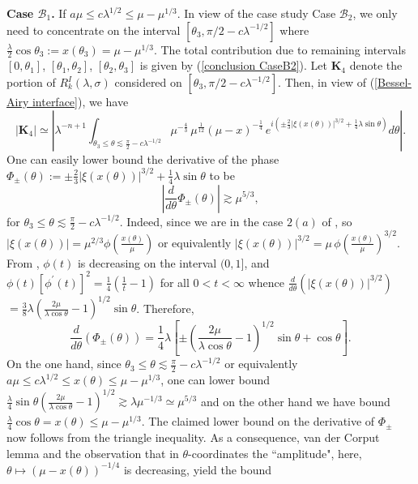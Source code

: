 \documentclass[11pt, reqno]{amsart}
\theoremstyle{plain}
\theoremstyle{remark}
\theoremstyle{example}
\theoremstyle{definition}
\numberwithin{equation}{section}
\begin{document}
\noindent \textbf{Case $\mathcal{B}_1$.} If $a \mu  \leq c \lambda^{1/2} \leq \mu - \mu^{1/3}$. In view of the case study Case $\mathcal{B}_{2}$, we only need to concentrate on the interval $[\theta_{3}, \pi / 2 - c \lambda^{-1/2}]$ where $\frac{\lambda}{2} \cos{\theta_{3}}:= x(\theta_{3})=\mu - \mu^{1/3}$. The total contribution due to remaining intervals $[0,\theta_{1}]$, $[\theta_{1},\theta_{2}]$, $[\theta_{2},\theta_{3}]$ is given by (\ref{conclusion CaseB2}). Let $ \textbf{K}_{4}$ denote the portion of $R_{k}^{I}(\lambda, \sigma)$ considered on $[\theta_{3}, \pi / 2 - c \lambda^{-1/2}]$. Then, in view of (\ref{Bessel-Airy interface}), we have
\begin{equation}\label{1 last piece Airy-Bessel}
  |\textbf{K}_{4}| \simeq \left| \lambda^{-n+1}  \int_{\theta_{3} \leq \theta \lesssim \frac{\pi}{2} - c \lambda^{-1/2}} \mu^{{-\textstyle\frac{4}{3}} } \,   \mu^{ {\textstyle\frac{1}{12} } }  ( \mu - x  )^{ - {\textstyle\frac{1}{4}  } }   \, e^{i \left( \pm \frac{2}{3}  |\xi(x(\theta))|^{3/2}    + \frac{1}{4} \lambda \sin{\theta}  \right) }    d \theta \right|.
\end{equation}
 One can easily lower bound the derivative of the phase $\Phi_{\pm}(\theta):= \pm \frac{2}{3}  |\xi(x(\theta))|^{3/2}    + \frac{1}{4} \lambda \sin{\theta}$  to be
\begin{equation*}
    \left| \frac{d}{d \theta} \Phi_{\pm} (\theta) \right| \gtrsim \mu^{5/3},
\end{equation*}   
for $\theta_{3} \leq \theta \lesssim \frac{\pi}{2} - c \lambda^{-1/2}$. Indeed, since we are in the case $2 (a)$ of , so $|\xi( x(\theta)) | =  \mu^{2/3} \phi \left( {\textstyle\frac{x(\theta)}{\mu} } \right)$ or equivalently $|\xi( x(\theta)) |^{3/2} =  \mu \, \phi \left( {\textstyle\frac{x(\theta)}{\mu} } \right)^{3/2}$. From \cite[page 698]{Askey-Wainger}, $\phi(t)$ is decreasing on the interval $(0,1]$, and $\phi(t) \left[ \phi^{\prime}(t) \right]^2  = \frac{1}{4} \left( \frac{1}{t} -1 \right)$ for all $0 < t< \infty$ whence $ \frac{d}{d \theta} \left( |\xi( x(\theta)) |^{3/2} \right) $ $ = { \textstyle\frac{3}{8} } \lambda \left(  \frac{2 \mu}{ \lambda \cos{\theta}} -1 \right)^{1/2} \sin{\theta}$. Therefore, 
\begin{equation*}
    \frac{d}{d \theta} \left( \Phi_{\pm} (\theta)  \right)=  \frac{1}{4} \lambda  \left[ \pm \left(  \frac{2 \mu}{ \lambda \cos{\theta}} -1 \right)^{1/2} \sin{\theta} + \cos{ \theta} \right].
\end{equation*}
On the one hand, since $\theta_{3} \leq \theta \lesssim \frac{\pi}{2} - c \lambda^{-1/2}$ or equivalently $a \mu \leq c \lambda^{1/2} \leq x (\theta) \leq \mu - \mu^{1/3}$, one can lower bound ${\textstyle\frac{\lambda}{4}} \sin{\theta} \left( \frac{2 \mu}{\lambda \cos{\theta}} -1 \right)^{1/2} \gtrsim \lambda \mu^{-1/3} \simeq \mu^{5/3}$ and on the other hand we have bound $\frac{\lambda}{4} \cos{\theta}= x(\theta) \leq \mu - \mu^{1/3}$. The claimed lower bound on the derivative of $\Phi_{\pm}$ now follows from the triangle inequality. As a consequence, van der Corput lemma and the observation that in  $\theta$-coordinates the ``amplitude", here, $ \theta \mapsto (\mu - x(\theta) )^{-1/4}$ is decreasing, yield the bound
\end{document}
